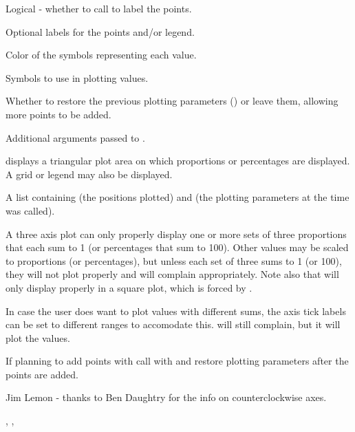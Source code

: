 \begin{Arguments}
\begin{ldescription}
\item[\code{label.points}] Logical - whether to call  to
label the points.
\item[\code{point.labels}] Optional labels for the points and/or legend.
\item[\code{col.symbols}] Color of the symbols representing each value.
\item[\code{pch}] Symbols to use in plotting values.
\item[\code{no.add}] Whether to restore the previous plotting parameters
() or leave them, allowing more points to be added.
\item[\code{...}] Additional arguments passed to .
\end{ldescription}
\end{Arguments}
\begin{Details}\relax
{} displays a triangular plot area on which proportions
or percentages are displayed. A grid or legend may also be displayed.
\end{Details}
\begin{Value}
A list containing  (the  positions plotted)
and  (the plotting parameters at the time 
was called).
\end{Value}
\begin{Note}\relax
A three axis plot can only properly display one or more
sets of three proportions that each sum to 1 (or percentages that sum
to 100). Other values may be scaled to proportions (or percentages), 
but unless each set of three sums to 1 (or 100), they will not plot
properly and  will complain appropriately. Note also
that  will only display properly in a square plot,
which is forced by .

In case the user does want to plot values with different sums, the
axis tick labels can be set to different ranges to accomodate this.
 will still complain, but it will plot the values.

If planning to add points with  call 
with  and restore plotting parameters after the
points are added.
\end{Note}
\begin{Author}\relax
Jim Lemon - thanks to Ben Daughtry for the info on counterclockwise axes.
\end{Author}
\begin{SeeAlso}\relax
{},
,
\end{SeeAlso}
